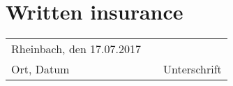 \documentclass[12pt,a4paper]{article}
\begin{document}
\newpage 								 
\medskip
\renewcommand{\bibname}{References}

   



\newpage
\section*{Written insurance}


\begin{tabular}{lp{2em}l}
	Rheinbach, den 17.07.2017   && 
	\\\cline{1-1}\cline{3-3}
	Ort, Datum     && Unterschrift
\end{tabular}
\end{document}
